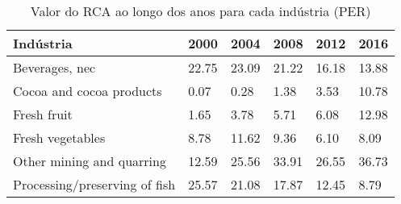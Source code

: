 \begin{table}
\centering
\caption{Valor do RCA ao longo dos anos para cada indústria (PER)}
\begin{tabular}{p{6cm}p{1.5cm}p{1.5cm}p{1.5cm}p{1.5cm}p{1.5cm}}
\toprule
                    Indústria &  2000 &  2004 &  2008 &  2012 &  2016 \\
\midrule
               Beverages, nec & 22.75 & 23.09 & 21.22 & 16.18 & 13.88 \\
     Cocoa and cocoa products &  0.07 &  0.28 &  1.38 &  3.53 & 10.78 \\
                  Fresh fruit &  1.65 &  3.78 &  5.71 &  6.08 & 12.98 \\
             Fresh vegetables &  8.78 & 11.62 &  9.36 &  6.10 &  8.09 \\
    Other mining and quarring & 12.59 & 25.56 & 33.91 & 26.55 & 36.73 \\
Processing/preserving of fish & 25.57 & 21.08 & 17.87 & 12.45 &  8.79 \\
\bottomrule
\end{tabular}
\end{table}
